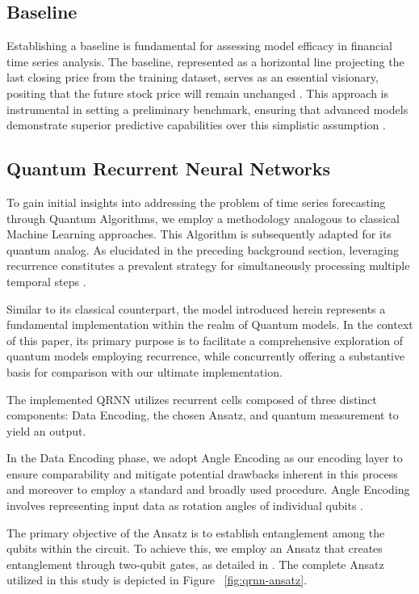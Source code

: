 \subsection{Baseline}
Establishing a baseline is fundamental for assessing model efficacy in financial time series analysis. The baseline, represented as a horizontal line projecting the last closing price from the training dataset, serves as an essential visionary, positing that the future stock price will remain unchanged \cite{hyndman2018forecasting}. This approach is instrumental in setting a preliminary benchmark, ensuring that advanced models demonstrate superior predictive capabilities over this simplistic assumption \cite{makridakis2020m4}.


\subsection{Quantum Recurrent Neural Networks}
To gain initial insights into addressing the problem of time series forecasting through Quantum Algorithms, we employ a methodology analogous to classical Machine Learning approaches. This Algorithm is subsequently adapted for its quantum analog. As elucidated in the preceding background section, leveraging recurrence constitutes a prevalent strategy for simultaneously processing multiple temporal steps \cite{li2023quantum} \cite{bausch2020recurrent}.

Similar to its classical counterpart, the model introduced herein represents a fundamental implementation within the realm of Quantum models. In the context of this paper, its primary purpose is to facilitate a comprehensive exploration of quantum models employing recurrence, while concurrently offering a substantive basis for comparison with our ultimate implementation.

The implemented QRNN utilizes recurrent cells composed of three distinct components: Data Encoding, the chosen Ansatz, and quantum measurement to yield an output.

In the Data Encoding phase, we adopt Angle Encoding as our encoding layer to ensure comparability and mitigate potential drawbacks inherent in this process and moreover to employ a standard and broadly used procedure. Angle Encoding involves representing input data as rotation angles of individual qubits \cite{li2023quantum}.

The primary objective of the Ansatz is to establish entanglement among the qubits within the circuit. To achieve this, we employ an Ansatz that creates entanglement through two-qubit gates, as detailed in \cite{Kraus_2001}. The complete Ansatz utilized in this study is depicted in Figure ~\ref{fig:qrnn-ansatz}.

